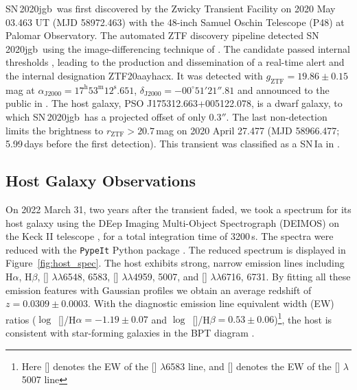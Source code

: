 \documentclass[twocolumn]{aastex631}
\newcommand{\sn}{SN\,2020jgb}
\newcommand{\chang}[1]{\textcolor{blue}{[Chang: #1]}}
\begin{document}
\sn\ was first discovered by the Zwicky Transient Facility \citep[ZTF;][]{ZTF2019a,ZTF2019b} on 2020 May 03.463 UT (MJD 58972.463) with the 48-inch Samuel Oschin Telescope (P48) at Palomar Observatory. The automated ZTF discovery pipeline \citep{Masci_2019} detected \sn\ using the image-differencing technique of \citet{Zackay_imagesub_2016}. The candidate passed internal thresholds \citep[e.g.,][]{Mahabal_ZTFML_2019, Duev_ZTFML_2019}, leading to the production and dissemination of a real-time alert \citep{Patterson_ZTFalert_2019} and the internal designation ZTF20aayhacx. It was detected with $g_\mathrm{ZTF} = 19.86 \pm 0.15\,$mag at $\alpha_\mathrm{J2000}=17^\mathrm{h}53^\mathrm{m}12^\mathrm{s}.651$, $\delta_\mathrm{J2000}=-00^\circ51'21''.81$ and announced to the public in \citet{Fremling_report_2020}. The host galaxy, PSO J175312.663+005122.078, is a dwarf galaxy, to which \sn\ has a projected offset of only $0.3''$. The last non-detection limits the brightness to $r_\mathrm{ZTF} > 20.7$\,mag on 2020 April 27.477 (MJD 58966.477; 5.99\,days before the first detection). This transient was classified as a SN\,Ia in \citet{TNS_2020}.%

\subsection{Host Galaxy Observations}
On 2022 March 31, two years after the transient faded, we took a spectrum for its host galaxy using the DEep Imaging Multi-Object Spectrograph (DEIMOS) on the Keck II telescope \citep{DEIMOS_2003}, for a total integration time of 3200\,s. The spectra were reduced with the \texttt{PypeIt} Python package \citep{pypeit:joss_pub}. The reduced spectrum is displayed in Figure~\ref{fig:host_spec}. 
The host exhibits strong, narrow emission lines including H$\alpha$, H$\beta$, [] $\lambda\lambda$6548, 6583, [] $\lambda\lambda$4959, 5007, and [] $\lambda\lambda$6716, 6731. By fitting all these emission features with Gaussian profiles we obtain an average redshift of $z=0.0309\pm0.0003$. With the diagnostic emission line equivalent width (EW) ratios ($\log$~[]/H$\alpha=-1.19\pm0.07$ and $\log$~[]/H$\beta=0.53\pm0.06$)\footnote{Here [] denotes the EW of the [] $\lambda$6583 line, and [] denotes the EW of the [] $\lambda$5007 line}, the host is consistent with star-forming galaxies in the BPT diagram \citep{BPT_1981, Veilleux_1987}. 
\end{document}

